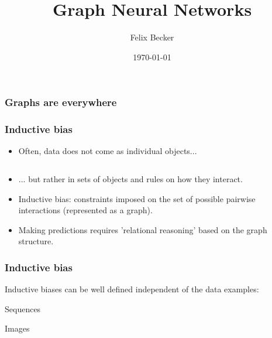 \documentclass{beamer}
\title{Graph Neural Networks}
\author{Felix Becker}
\institute{University of Greifswald}
\date{\today}
\begin{document}
\frame{\titlepage}

\begin{frame}
\frametitle{Graphs are everywhere}
\centering {}
\end{frame}

\begin{frame}
\frametitle{Inductive bias}
\begin{itemize}
\item Often, data does not come as individual objects...

\begin{columns}[T]
\begin{column}{.4\textwidth}
\centering {}
\end{column} \pause
\begin{column}{.6\textwidth}
\end{column}
\end{columns}

\item  ... but rather in sets of objects and rules on how they interact. \pause
\item  Inductive bias: constraints imposed on the set of possible pairwise interactions (represented as a graph). \pause

\item Making predictions requires 'relational reasoning' based on the graph structure.
\end{itemize}
\end{frame}


\begin{frame}
\frametitle{Inductive bias}
Inductive biases can be well defined independent of the data examples: \pause 
\begin{block}{Sequences}
\centering {} \pause
\end{block}
\begin{block}{Images}
\begin{columns}[T]
\begin{column}{.6\textwidth}
\centering {}
\end{column} 
\begin{column}{.5\textwidth}
\end{column}
\end{columns}
\end{block} 
\end{frame}
\end{document}
